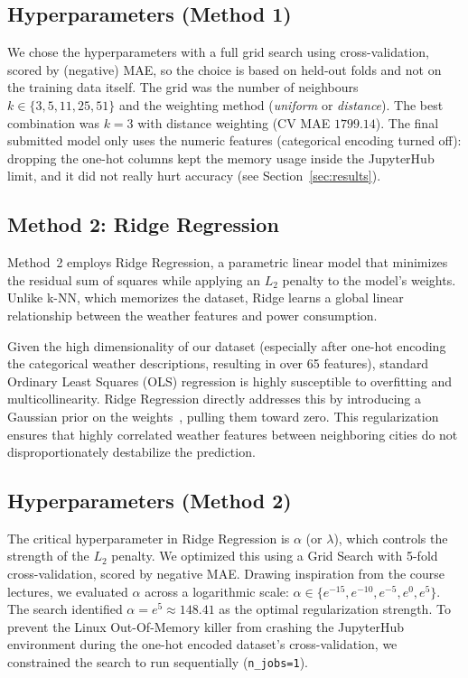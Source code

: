 \documentclass[a4, 10 pt, conference]{ieeeconf}  %
\begin{document}
\subsection*{Hyperparameters (Method 1)}
We chose the hyperparameters with a full grid search using cross-validation,
scored by (negative) MAE, so the choice is based on held-out folds and not on
the training data itself. The grid was the number of neighbours $k \in \{3,
5, 11, 25, 51\}$ and the weighting method (\emph{uniform} or
\emph{distance}). The best combination was $k = 3$ with distance weighting
(CV MAE $1799.14$). The final submitted model only uses the numeric features
(categorical encoding turned off): dropping the one-hot columns kept the
memory usage inside the JupyterHub limit, and it did not really hurt
accuracy (see Section~\ref{sec:results}).

\subsection*{Method 2: Ridge Regression}
Method~2 employs Ridge Regression, a parametric linear model that minimizes the residual sum of squares while applying an $L_2$ penalty to the model's weights. Unlike k-NN, which memorizes the dataset, Ridge learns a global linear relationship between the weather features and power consumption.

Given the high dimensionality of our dataset (especially after one-hot encoding the categorical weather descriptions, resulting in over 65 features), standard Ordinary Least Squares (OLS) regression is highly susceptible to overfitting and multicollinearity. Ridge Regression directly addresses this by introducing a Gaussian prior on the weights~\cite{vo-linreg}, pulling them toward zero. This regularization ensures that highly correlated weather features between neighboring cities do not disproportionately destabilize the prediction.

\subsection*{Hyperparameters (Method 2)}
The critical hyperparameter in Ridge Regression is $\alpha$ (or $\lambda$), which controls the strength of the $L_2$ penalty. We optimized this using a Grid Search with 5-fold cross-validation, scored by negative MAE. Drawing inspiration from the course lectures, we evaluated $\alpha$ across a logarithmic scale: $\alpha \in \{e^{-15}, e^{-10}, e^{-5}, e^0, e^5\}$. The search identified $\alpha = e^5 \approx 148.41$ as the optimal regularization strength. To prevent the Linux Out-Of-Memory killer from crashing the JupyterHub environment during the one-hot encoded dataset's cross-validation, we constrained the search to run sequentially (\texttt{n\_jobs=1}).
\end{document}

